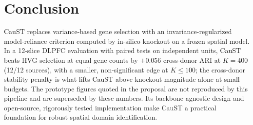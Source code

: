 \documentclass[11pt]{article}
\begin{document}
\section{Conclusion}
\label{sec:conclusion}

CauST replaces variance-based gene selection with an invariance-regularized
model-reliance criterion computed by in-silico knockout on a frozen spatial
model. In a 12-slice DLPFC evaluation with paired tests on independent units,
CauST beats HVG selection at equal gene counts by $+0.056$ cross-donor ARI at
$K=400$ (12/12 sources), with a smaller, non-significant edge at $K\le 100$;
the cross-donor stability penalty is what lifts CauST above knockout magnitude
alone at small budgets. The prototype figures quoted in the proposal are not
reproduced by this pipeline and are superseded by these numbers. Its
backbone-agnostic design and open-source, rigorously
tested implementation make CauST a practical foundation for robust spatial
domain identification.
\end{document}
